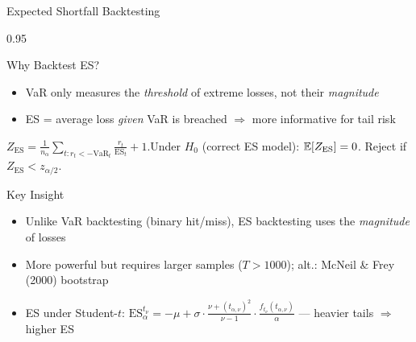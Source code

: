 \documentclass[9pt, aspectratio=169, t]{beamer}
\begin{document}
\begin{frame}{Expected Shortfall Backtesting}
    \begin{cminipage}{0.95\textwidth}
    \scriptsize
    \setlength{\abovedisplayskip}{2pt}\setlength{\belowdisplayskip}{2pt}
    \vspace{-0.3cm}
    \begin{block}{Why Backtest ES?}
        \begin{itemize}\setlength{\itemsep}{0pt}
            \item VaR only measures the \textit{threshold} of extreme losses, not their \textit{magnitude}
            \item ES = average loss \textit{given} VaR is breached $\Rightarrow$ more informative for tail risk
        \end{itemize}
    \end{block}
    \vspace{-0.15cm}
    \begin{defn}
        $Z_{\text{ES}} = \frac{1}{n_\alpha} \sum_{t: r_t < -\text{VaR}_t} \frac{r_t}{\text{ES}_t} + 1$.\quad Under $H_0$ (correct ES model): $\mathbb{E}[Z_{\text{ES}}] = 0$. Reject if $Z_{\text{ES}} < z_{\alpha/2}$.
    \end{defn}
    \vspace{-1.5mm}
    \begin{alertblock}{Key Insight}
        \begin{itemize}\setlength{\itemsep}{0pt}
            \item Unlike VaR backtesting (binary hit/miss), ES backtesting uses the \textit{magnitude} of losses
            \item More powerful but requires larger samples ($T > 1000$); alt.: McNeil \& Frey (2000) bootstrap
            \item ES under Student-$t$: $\text{ES}_\alpha^{t_\nu} = -\mu + \sigma \cdot \frac{\nu + (t_{\alpha,\nu})^2}{\nu - 1} \cdot \frac{f_{t_\nu}(t_{\alpha,\nu})}{\alpha}$ --- heavier tails $\Rightarrow$ higher ES
        \end{itemize}
    \end{alertblock}
    \end{cminipage}
\end{frame}
\end{document}
